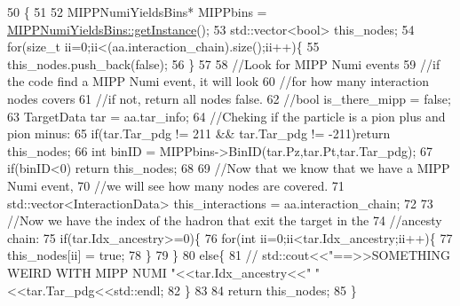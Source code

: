 \begin{DoxyCode}
50                                                                                          \{
51  
52     MIPPNumiYieldsBins*  MIPPbins =  \hyperlink{class_neutrino_flux_reweight_1_1_m_i_p_p_numi_yields_bins_a7f44afe90a846812d6eabfafa8f576e4}{MIPPNumiYieldsBins::getInstance}();
53     std::vector<bool> this\_nodes;
54     \textcolor{keywordflow}{for}(\textcolor{keywordtype}{size\_t} ii=0;ii<(aa.interaction\_chain).size();ii++)\{
55       this\_nodes.push\_back(\textcolor{keyword}{false});
56     \}
57    
58     \textcolor{comment}{//Look for MIPP Numi events}
59     \textcolor{comment}{//if the code find a MIPP Numi event, it will look }
60     \textcolor{comment}{//for how many interaction nodes covers}
61     \textcolor{comment}{//if not, return all nodes false.}
62     \textcolor{comment}{//bool is\_there\_mipp = false;   }
63     TargetData tar = aa.tar\_info;
64     \textcolor{comment}{//Cheking if the particle is a pion plus and pion minus:}
65     \textcolor{keywordflow}{if}(tar.Tar\_pdg != 211 && tar.Tar\_pdg != -211)\textcolor{keywordflow}{return} this\_nodes;
66     \textcolor{keywordtype}{int} binID = MIPPbins->BinID(tar.Pz,tar.Pt,tar.Tar\_pdg);
67     \textcolor{keywordflow}{if}(binID<0) \textcolor{keywordflow}{return} this\_nodes;    
68     
69     \textcolor{comment}{//Now that we know that we have a MIPP Numi event, }
70     \textcolor{comment}{//we will see how many nodes are covered.}
71     std::vector<InteractionData> this\_interactions = aa.interaction\_chain; 
72     
73     \textcolor{comment}{//Now we have the index of the hadron that exit the target in the }
74     \textcolor{comment}{//ancesty chain:}
75     \textcolor{keywordflow}{if}(tar.Idx\_ancestry>=0)\{
76       \textcolor{keywordflow}{for}(\textcolor{keywordtype}{int} ii=0;ii<tar.Idx\_ancestry;ii++)\{
77         this\_nodes[ii] = \textcolor{keyword}{true};
78       \}
79     \}
80     \textcolor{keywordflow}{else}\{
81       \textcolor{comment}{//  std::cout<<"==>>SOMETHING WEIRD WITH MIPP NUMI "<<tar.Idx\_ancestry<<" "<<tar.Tar\_pdg<<std::endl;}
82     \}
83     
84     \textcolor{keywordflow}{return} this\_nodes;
85   \}
\end{DoxyCode}


